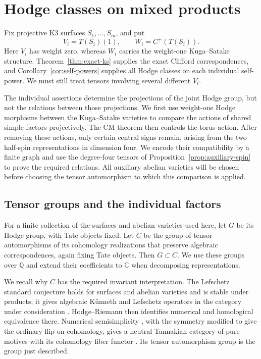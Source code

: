 \documentclass[11pt]{article}
\numberwithin{equation}{section}
\theoremstyle{definition}
\theoremstyle{remark}
\begin{document}
\section{Hodge classes on mixed products}\label{sec:mixed}

Fix projective K3 surfaces $S_1,\ldots,S_m$, and put
\[
 V_i=T(S_i)(1),\qquad W_i=C^+(T(S_i)).
\]
Here $V_i$ has weight zero, whereas $W_i$ carries the weight-one
Kuga--Satake structure.  Theorem~\ref{thm:exact-ks} supplies the exact
Clifford correspondences, and Corollary~\ref{cor:self-powers} supplies all
Hodge classes on each individual self-power.  We must still treat tensors
involving several different $V_i$.

The individual assertions determine the projections of the joint Hodge
group, but not the relations between those projections.  We first use
weight-one Hodge morphisms between the Kuga--Satake varieties to compare
the actions of shared simple factors projectively.  The CM theorem then
controls the torus action.  After removing these actions, only certain
central signs remain, arising from the two half-spin representations in
dimension four.  We encode their compatibility by a finite graph and use
the degree-four tensors of Proposition~\ref{prop:auxiliary-spin} to prove
the required relations.  All auxiliary abelian varieties will be chosen
before choosing the tensor automorphism to which this comparison is
applied.

\subsection{Tensor groups and the individual factors}

For a finite collection of the surfaces and abelian varieties used here,
let $G$ be its Hodge group, with Tate objects fixed.  Let $C$ be the group
of tensor automorphisms of its cohomology realizations that preserve
algebraic correspondences, again fixing Tate objects.  Then $G\subset C$.
We use these groups over $\mathbb Q$ and extend their coefficients to $\mathbb C$ when
decomposing representations.

We recall why $C$ has the required invariant interpretation.  The
Lefschetz standard conjecture holds for surfaces and abelian varieties
and is stable under products; it gives algebraic K\"unneth and Lefschetz
operators in the category under consideration
\cite{KleimanStandard}.  Hodge--Riemann then identifies numerical and
homological equivalence there.  Numerical semisimplicity
\cite{JannsenMotives}, with the symmetry modified to give the ordinary
flip on cohomology, gives a neutral Tannakian category of pure motives
with its cohomology fiber functor \cite{DeligneMilneTannakian}.
Its tensor automorphism group is the group just described.
\end{document}

